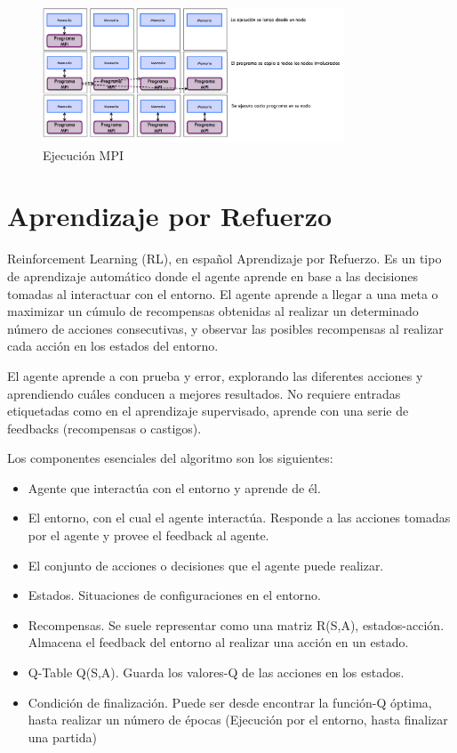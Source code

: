 \newpage

\begin{figure}[!h]
	\centering
	\includegraphics[width=0.8\textwidth]{images/chapter_2/mpi_2}
	\caption{Ejecución MPI}
	\label{fig:ejecucion_mpi}
\end{figure}



\section{Aprendizaje por Refuerzo}

Reinforcement Learning (RL), en español Aprendizaje por Refuerzo. Es un tipo de aprendizaje automático donde el agente aprende en base a las decisiones tomadas al interactuar con el entorno. El agente aprende a llegar a una meta o maximizar un cúmulo de recompensas obtenidas al realizar un determinado número de acciones consecutivas, y observar las posibles recompensas al realizar cada acción en los estados del entorno.

El agente aprende a con prueba y error, explorando las diferentes acciones y aprendiendo cuáles conducen a mejores resultados. No requiere entradas etiquetadas como en el aprendizaje supervisado, aprende con una serie de feedbacks (recompensas o castigos).

\begin{flushleft}
	Los componentes esenciales del algoritmo son los siguientes:
\end{flushleft}
\begin{itemize}
	\item Agente que interactúa con el entorno y aprende de él. 
	\item El entorno, con el cual el agente interactúa. Responde a las acciones tomadas por el agente y provee el feedback al agente.
	\item El conjunto de acciones o decisiones que el agente puede realizar.
	\item Estados. Situaciones de configuraciones en el entorno.
	\item Recompensas. Se suele representar como una matriz R(S,A), estados-acción. Almacena el feedback del entorno al realizar una acción en un estado.
	\item Q-Table Q(S,A). Guarda los valores-Q de las acciones en los estados.
	\item Condición de finalización. Puede ser desde encontrar la función-Q óptima, hasta realizar un número de épocas (Ejecución por el entorno, hasta finalizar una partida)
\end{itemize}


